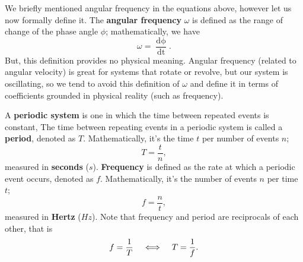We briefly mentioned angular frequency in the equations above, however let us now formally define it. The \textbf{angular frequency} $\omega$ is defined as the range of change of the phase angle $\phi$; mathematically, we have
\begin{equation}
    \omega = \frac{\mathop{\mathrm{d}\phi}}{\mathop{\mathrm{d}t}}.
\end{equation}
But, this definition provides no physical meaning. Angular frequency (related to angular velocity) is great for systems that rotate or revolve, but our system is oscillating, so we tend to avoid this definition of $\omega$ and define it in terms of coefficients grounded in physical reality (such as frequency).  

A \textbf{periodic system} is one in which the time between repeated events is constant, The time between repeating events in a periodic system is called a \textbf{period}, denoted as $T$. Mathematically, it's the time $t$ per number of events $n$;
\begin{equation}
    T = \frac{t}{n},
\end{equation}
measured in \textbf{seconds} ($s$). \textbf{Frequency} is defined as the rate at which a periodic event occurs, denoted as $f$. Mathematically, it's the number of events $n$ per time $t$;
\begin{equation}
    f = \frac{n}{t},
\end{equation}
measured in \textbf{Hertz} ($Hz$). Note that frequency and period are reciprocals of each other, that is
\begin{equation*}
    f = \frac{1}{T} \hspace{3mm} \iff \hspace{3mm} T = \frac{1}{f}.
\end{equation*}

